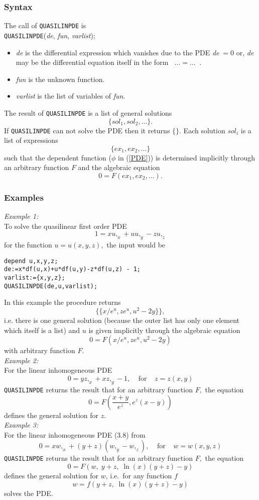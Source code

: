 \subsubsection{Syntax}
The call of \texttt{QUASILINPDE} is \\
\texttt{QUASILINPDE}(\textit{de}, \textit{fun}, \textit{varlist});
\begin{itemize}
\item
\textit{de} is the differential expression which vanishes due to the PDE
\textit{de}$\; = 0$ or, \textit{de} may be the differential equation itself in the
form $\;\;\ldots = \ldots\;\;$.
\item
\textit{fun} is the unknown function.
\item
\textit{varlist} is the list of variables of \textit{fun}.
\end{itemize}
The result of \texttt{QUASILINPDE} is a list of general solutions
\[      \{\textit{sol}_1, \textit{sol}_2, \ldots \}.  \]
If \texttt{QUASILINPDE} can not solve the PDE then it returns $\{\}$.
Each solution $\textit{sol}_i$ is a list of expressions
\[      \{\textit{ex}_1, \textit{ex}_2, \ldots \}  \]
such that the dependent function ($\phi$ in (\ref{PDE})) is determined
implicitly through an arbitrary function $F$ and the algebraic
equation \[ 0 = F(\textit{ex}_1, \textit{ex}_2, \ldots). \]
\subsubsection{Examples}
{\em Example 1:}\\
To solve the quasilinear first order PDE \[1 = xu,_x + uu,_y - zu,_z\]
for the function $u = u(x,y,z),$ the input would be
\small \begin{verbatim}
depend u,x,y,z;
de:=x*df(u,x)+u*df(u,y)-z*df(u,z) - 1;
varlist:={x,y,z};
QUASILINPDE(de,u,varlist);
\end{verbatim} \normalsize
In this example the procedure returns
\[\{ \{ x/e^u, ze^u, u^2 - 2y \} \},\] 
i.e. there is one general solution (because the outer list has only one
element which itself is a list) and $u$ is given implicitly through 
the algebraic equation
\[ 0 = F(x/e^u, ze^u, u^2 - 2y)\] 
with arbitrary function $F.$ \\
{\em Example 2:}\\
For the linear inhomogeneous PDE
\[ 0 = y z,_x + x z,_y - 1, \;\;\;\;\mbox{for}\;\;\;\;z=z(x,y)\]
\texttt{QUASILINPDE} returns the result that for an arbitrary function $F,$ the
equation
\[ 0 = F\left(\frac{x+y}{e^z},e^z(x-y)\right) \]
defines the general solution for $z$. \\
{\em Example 3:}\\
For the linear inhomogeneous PDE (3.8) from \cite{KamkePDE}
\[ 0 = x w,_x + (y+z)(w,_y - w,_z), \;\;\;\;\mbox{for}\;\;\;\;w=w(x,y,z)\]
\texttt{QUASILINPDE} returns the result 
that for an arbitrary function $F,$ the equation
\[ 0 = F\left(w, \;y+z, \;\ln(x)(y+z)-y\right) \]
defines the general solution for $w$, i.e.\ for any function $f$
\[ w = f\left(y+z, \;\ln(x)(y+z)-y\right) \]
solves the PDE.
